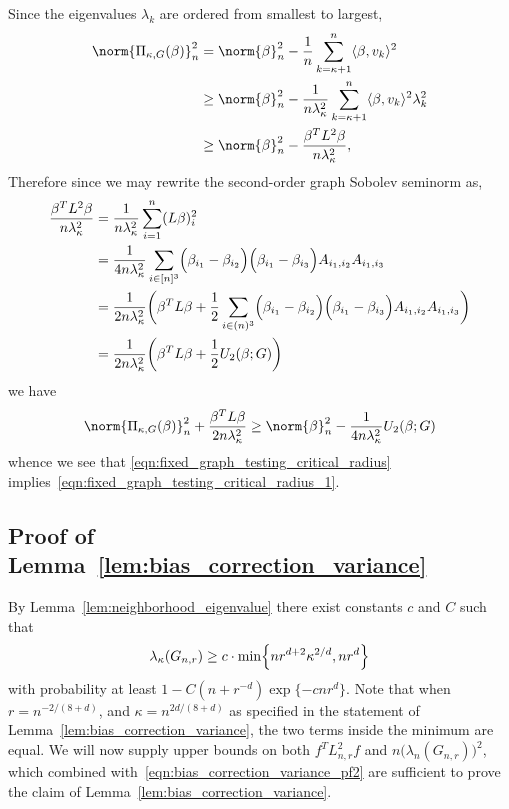 \documentclass{article}
\newcommand{\1}{\mathbf{1}}
\newcommand{\dotp}[2]{\langle #1, #2 \rangle}
\theoremstyle{alden}
\theoremstyle{aldenthm}
\theoremstyle{definition}
\theoremstyle{remark}
\begin{document}
Since the eigenvalues $\lambda_k$ are ordered from smallest to largest, 
\begin{align*}
\norm{\Pi_{\kappa,G}(\beta)}_n^2 & = \norm{\beta}_n^2 - \frac{1}{n}\sum_{k = \kappa + 1}^{n} \dotp{\beta}{v_k}^2 \\
& \geq \norm{\beta}_n^2 - \frac{1}{n \lambda_{\kappa}^2}\sum_{k = \kappa + 1}^{n} \dotp{\beta}{v_k}^2 \lambda_k^2 \\
& \geq \norm{\beta}_n^2 - \frac{\beta^T L^2 \beta}{n\lambda_{\kappa}^2},
\end{align*}
Therefore since we may rewrite the second-order graph Sobolev seminorm as,
\begin{align*}
\frac{\beta^T L^2 \beta}{n \lambda_{\kappa}^2} & = \frac{1}{n \lambda_{\kappa}^2} \sum_{i = 1}^{n} (L\beta)_i^2 \\
& = \frac{1}{4 n \lambda_{\kappa}^2} \sum_{i \in [n]^3} \Bigl(\beta_{i_1} - \beta_{i_2}\Bigr) \Bigl(\beta_{i_1} - \beta_{i_3}\Bigr) A_{i_1,i_2} A_{i_1,i_3} \\
& = \frac{1}{2 n \lambda_{\kappa}^2} \biggl(\beta^T L \beta + \frac{1}{2} \sum_{i \in (n)^3} \Bigl(\beta_{i_1} - \beta_{i_2}\Bigr) \Bigl(\beta_{i_1} - \beta_{i_3}\Bigr) A_{i_1,i_2} A_{i_1,i_3} \biggr) \\
& = \frac{1}{2 n \lambda_{\kappa}^2} \biggl(\beta^T L \beta + \frac{1}{2}U_2(\beta;G) \biggr)
\end{align*}
we have
\begin{equation*}
\norm{\Pi_{\kappa,G}(\beta)}_n^2 + \frac{\beta^T L \beta}{2 n \lambda_{\kappa}^2} \geq \norm{\beta}_n^2 - \frac{1}{4 n \lambda_{\kappa}^2}U_2(\beta;G)
\end{equation*}
whence we see that \eqref{eqn:fixed_graph_testing_critical_radius} implies~\eqref{eqn:fixed_graph_testing_critical_radius_1}.

\subsection{Proof of Lemma~\ref{lem:bias_correction_variance}}

By Lemma~\ref{lem:neighborhood_eigenvalue} there exist constants $c$ and $C$ such that 
\begin{equation}
\label{eqn:bias_correction_variance_pf2}
\lambda_{\kappa}(G_{n,r}) \geq c \cdot \min\Bigl\{n r^{d + 2} \kappa^{2/d}, n r^d\Bigr\}
\end{equation}
with probability at least $1 - C(n + r^{-d}) \exp\{-c nr^d\}$. Note that when $r = n^{-2/(8 + d)}$, and $\kappa = n^{2d/(8 + d)}$ as specified in the statement of Lemma~\ref{lem:bias_correction_variance}, the two terms inside the minimum are equal. We will now supply upper bounds on both $f^T L_{n,r}^2 f$ and $n \bigl(\lambda_n(G_{n,r})\bigr)^2$, which combined with~\eqref{eqn:bias_correction_variance_pf2} are sufficient to prove the claim of Lemma~\ref{lem:bias_correction_variance}.
\end{document}
